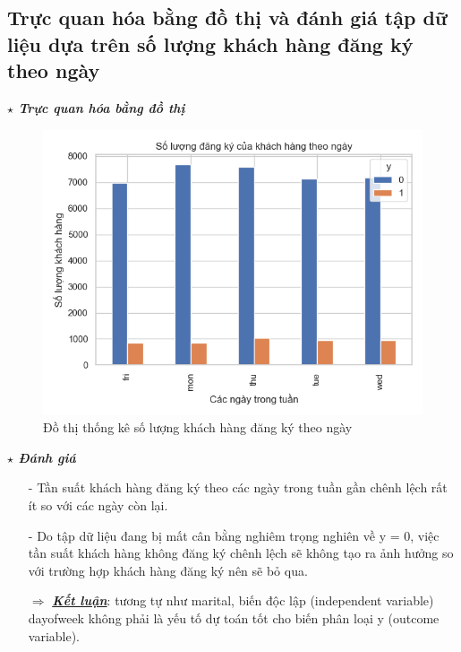 \documentclass{report}
\begin{document}
        \pagebreak

        \subsection{Trực quan hóa bằng đồ thị và đánh giá tập dữ liệu dựa trên số lượng khách hàng đăng ký theo ngày}
            \fontsize{13}{10}\selectfont \textbf{$\star$\textit{ Trực quan hóa bằng đồ thị}}
                \begin{figure}[htp]
                    \centering
                    \includegraphics[scale = 0.8]{image/frequency_dayofweek.png}
                    \caption{Đồ thị thống kê  số lượng khách hàng đăng ký theo ngày}
                \end{figure}
            
            \fontsize{13}{10}\selectfont \textbf{$\star$\textit{ Đánh giá}}
                \begin{enumerate}
                    \item [- ] Tần suất khách hàng đăng ký theo các ngày trong tuần gần chênh lệch rất ít so với các ngày còn lại.
                    \item [- ] Do tập dữ liệu đang bị mất cân bằng nghiêm trọng nghiên về y = 0, việc tần suất khách hàng không đăng ký chênh lệch sẽ không tạo ra ảnh hưởng so với trường hợp khách hàng đăng ký nên sẽ bỏ qua.
                    \item [$\Rightarrow$] \textbf{\underline{\textit{Kết luận}}}: tương tự như marital, biến độc lập (independent variable) dayofweek không phải là yếu tố dự toán tốt cho biến phân loại y (outcome variable).
                \end{enumerate}
            
\end{document}
